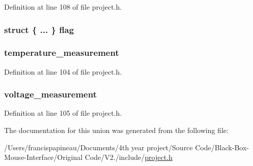 \-Definition at line 108 of file project.\-h.

\hypertarget{unions__request__flags_aa7856aa1edd0e3f26421a3283901e2e7}{
\subsubsection[{flag}]{\setlength{\rightskip}{0pt plus 5cm}struct \{ ... \}   {\bf flag}}}\label{unions__request__flags_aa7856aa1edd0e3f26421a3283901e2e7}
\hypertarget{unions__request__flags_a851b146818d28e82773d793261389b80}{
\subsubsection[{temperature\-\_\-measurement}]{ {\bf temperature\-\_\-measurement}}}\label{unions__request__flags_a851b146818d28e82773d793261389b80}


\-Definition at line 104 of file project.\-h.

\hypertarget{unions__request__flags_a34ac0ac4c8f59b9ed016337d132c0961}{
\subsubsection[{voltage\-\_\-measurement}]{ {\bf voltage\-\_\-measurement}}}\label{unions__request__flags_a34ac0ac4c8f59b9ed016337d132c0961}


\-Definition at line 105 of file project.\-h.



\-The documentation for this union was generated from the following file\-:\begin{DoxyCompactItemize}
\item 
/\-Users/francispapineau/\-Documents/4th year project/\-Source Code/\-Black-\/\-Box-\/\-Mouse-\/\-Interface/\-Original Code/\-V2./include/\hyperlink{project_8h}{project.\-h}\end{DoxyCompactItemize}
